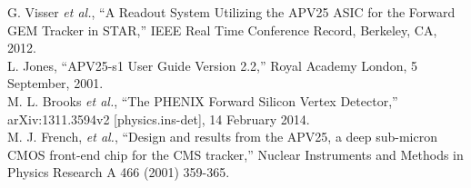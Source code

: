 \documentclass[1p,12pt]{elsarticle}
\begin{document}
\begin{thebibliography}{999}
G. Visser {\it et al.}, ``A Readout System Utilizing the APV25 ASIC for the
Forward GEM Tracker in STAR,'' IEEE Real Time Conference Record, Berkeley, CA,
2012. \\
L. Jones, ``APV25-s1 User Guide Version 2.2,'' Royal Academy London, 5
September, 2001. \\
M. L. Brooks {\it et al.}, ``The PHENIX Forward Silicon Vertex Detector,''
arXiv:1311.3594v2 [physics.ins-det], 14 February 2014.\\
M. J. French, {\it et al.}, ``Design and results from the APV25, a deep
sub-micron CMOS front-end chip for the CMS tracker,'' Nuclear Instruments and
Methods in Physics Research A 466 (2001) 359-365.\\
\end{thebibliography}
\end{document}
